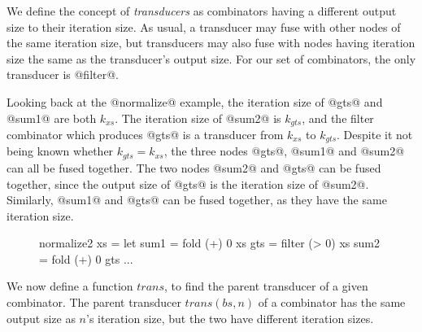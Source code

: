We define the concept of \emph{transducers} as combinators having a different output size to their iteration size.
As usual, a transducer may fuse with other nodes of the same iteration size, but transducers may also fuse with nodes having iteration size the same as the transducer's output size.
For our set of combinators, the only transducer is @filter@.

Looking back at the @normalize@ example, the iteration size of @gts@ and @sum1@ are both $k_{xs}$.
The iteration size of @sum2@ is $k_{gts}$, and the filter combinator which produces @gts@ is a transducer from $k_{xs}$ to $k_{gts}$. 
Despite it not being known whether $k_{gts} = k_{xs}$, the three nodes @gts@, @sum1@ and @sum2@ can all be fused together.
The two nodes @sum2@ and @gts@ can be fused together, since the output size of @gts@ is the iteration size of @sum2@.
Similarly, @sum1@ and @gts@ can be fused together, as they have the same iteration size.
\begin{figure}[H]
\begin{code}
 normalize2 xs
  = let sum1 = fold   (+)  0   xs
        gts  = filter (> 0)    xs
        sum2 = fold   (+)  0   gts
        ...
\end{code}
\end{figure}

We now define a function $trans$, to find the parent transducer of a given combinator.
The parent transducer $trans(bs, n)$ of a combinator has the same output size as $n$'s iteration size, but the two have different iteration sizes.

